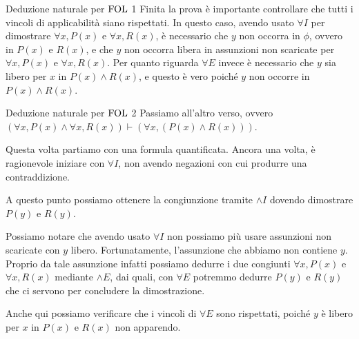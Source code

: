 \begin{example}{Deduzione naturale per \(\FOL\) 1}
  Finita la prova è importante controllare che tutti i vincoli di applicabilità siano rispettati. In questo caso, avendo usato \(\forall I\) per dimostrare \(\forall x, P(x)\) e \(\forall x, R(x)\), è necessario che \(y\) non occorra in \(\phi\), ovvero in \(P(x)\) e \(R(x)\), e che \(y\) non occorra libera in assunzioni non scaricate per \(\forall x, P(x)\) e \(\forall x, R(x)\). Per quanto riguarda \(\forall E\) invece è necessario che \(y\) sia libero per \(x\) in \(P(x) \land R(x)\), e questo è vero poiché \(y\) non occorre in \(P(x) \land R(x)\).
  \end{example}
  \begin{example}{Deduzione naturale per \(\FOL\) 2}
  Passiamo all'altro verso, ovvero \((\forall x, P(x) \land \forall x, R(x))\vdash (\forall x, (P(x) \land R(x)))\).

  Questa volta partiamo con una formula quantificata. Ancora una volta, è ragionevole iniziare con \(\forall I\), non avendo negazioni con cui produrre una contraddizione.

  \begin{prooftree}
  \end{prooftree}

  A questo punto possiamo ottenere la congiunzione tramite \(\land I\) dovendo dimostrare \(P(y)\) e \(R(y)\).
  
  \begin{prooftree}
  \end{prooftree}

  Possiamo notare che avendo usato \(\forall I\) non possiamo più usare assunzioni non scaricate con \(y\) libero. Fortunatamente, l'assunzione che abbiamo non contiene \(y\). Proprio da tale assunzione infatti possiamo dedurre i due congiunti \(\forall x, P(x)\) e \(\forall x, R(x)\) mediante \(\land E\), dai quali, con \(\forall E\) potremmo dedurre \(P(y)\) e \(R(y)\) che ci servono per concludere la dimostrazione.

  \begin{prooftree}
      
  \end{prooftree}

  Anche qui possiamo verificare che i vincoli di \(\forall E\) sono rispettati, poiché \(y\) è libero per \(x\) in \(P(x)\) e \(R(x)\) non apparendo.
\end{example}

